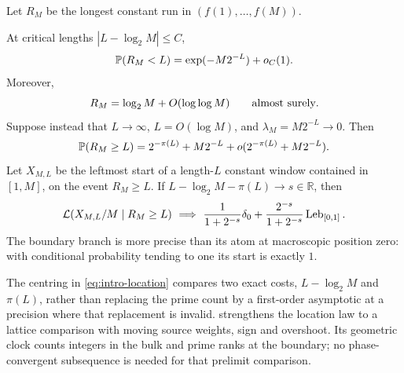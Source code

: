 Let $R_M$ be the longest constant run in $(f(1),\ldots,f(M))$.
\begin{theorem}
\label{thm:global-summary}
At critical lengths $|L-\log_2M|\le C$,
\begin{equation}\label{eq:intro-prefix}
 \mathbb P(R_M<L)=\exp(-M2^{-L})+o_C(1).
\end{equation}
Moreover,
\begin{equation}\label{eq:intro-as}
 R_M=\log_2M+O(\log\log M)\qquad\hbox{almost surely}.
\end{equation}
Suppose instead that $L\to\infty$, $L=O(\log M)$, and
$\lambda_M=M2^{-L}\to0$. Then
\begin{equation}\label{eq:intro-two-source}
 \mathbb P(R_M\ge L)=2^{-\pi(L)}+M2^{-L}
                  +o(2^{-\pi(L)}+M2^{-L}).
\end{equation}
Let $X_{M,L}$ be the leftmost start of a length-$L$ constant window contained
in $[1,M]$, on the event $R_M\ge L$. If
$L-\log_2M-\pi(L)\to s\in\mathbb R$, then
\begin{equation}\label{eq:intro-location}
 \mathcal L(X_{M,L}/M\mid R_M\ge L)
 \ \Longrightarrow\
 \frac1{1+2^{-s}}\delta_0+
 \frac{2^{-s}}{1+2^{-s}}\operatorname{Leb}_{[0,1]}.
\end{equation}
The boundary branch is more precise than its atom at macroscopic position
zero: with conditional probability tending to one its start is exactly $1$.
\end{theorem}
The centring in \eqref{eq:intro-location} compares two exact
costs, $L-\log_2M$ and $\pi(L)$, rather than replacing the prime count by a
first-order asymptotic at a precision where that replacement is invalid.
\Cref{thm:two-clock} strengthens the location law to a lattice comparison
with moving source weights, sign and overshoot. Its geometric clock counts
integers in the bulk and prime ranks at the boundary; no phase-convergent
subsequence is needed for that prelimit comparison.

